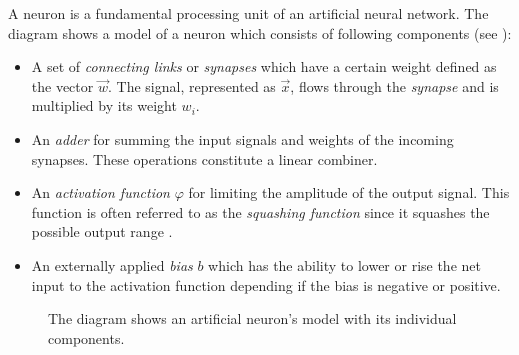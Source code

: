 A neuron is a fundamental processing unit of an artificial neural network. The diagram \label{fig:neuron} shows a model of a neuron which consists of following components (see \cite{Haykin:1998:NNC:521706}):
\begin{itemize}
  \item A set of \textit{connecting links} or \textit{synapses} which have a certain weight defined as the vector $\vec{w}$. The signal, represented as $\vec{x}$, flows through the \textit{synapse} and is multiplied by its weight $w_i$.
  \item An \textit{adder} for summing the input signals and weights of the incoming synapses. These operations constitute a linear combiner.
  \item An \textit{activation function} $\varphi$ for limiting the amplitude of the output signal. This function is often referred to as the \textit{squashing function} since it squashes the possible output range \cite{Haykin:1998:NNC:521706}.
  \item An externally applied \textit{bias} $b$ which has the ability to lower or rise the net input to the activation function depending if the bias is negative or positive.
\end{itemize}
\begin{figure}[h]
  \centering
  \caption{The diagram shows an artificial neuron's model with its individual components.}\label{fig:neuron}
\end{figure}

